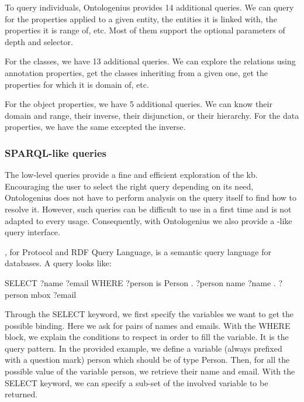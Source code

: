 To query individuals, Ontologenius provides 14 additional queries. We can query for the properties applied to a given entity, the entities it is linked with, the properties it is range of, etc. Most of them support the optional parameters of depth and selector.

For the classes, we have 13 additional queries. We can explore the relations using annotation properties, get the classes inheriting from a given one, get the properties for which it is domain of, etc.

For the object properties, we have 5 additional queries. We can know their domain and range, their inverse, their disjunction, or their hierarchy. For the data properties, we have the same excepted the inverse.

\subsubsection{SPARQL-like queries}

The low-level queries provide a fine and efficient exploration of the \acrshort{kb}. Encouraging the user to select the right query depending on its need, Ontologenius does not have to perform analysis on the query itself to find how to resolve it. However, such queries can be difficult to use in a first time and is not adapted to every usage. Consequently, with Ontologenius we also provide a \sparql{}-like query interface.

\sparql{}, for \sparql{} Protocol and RDF Query Language, is a semantic query language for databases. A \sparql{} query looks like:\\

\begin{minipage}{\textwidth}
\begin{verbatimtab}
SELECT ?name 
       ?email
WHERE
  {
    ?person  is    Person .
    ?person  name  ?name .
    ?person  mbox  ?email
  }
\end{verbatimtab}
\end{minipage}

Through the SELECT keyword, we first specify the variables we want to get the possible binding. Here we ask for pairs of names and emails. With the WHERE block, we explain the conditions to respect in order to fill the variable. It is the query pattern. In the provided example, we define a variable (always prefixed with a question mark) person which should be of type Person. Then, for all the possible value of the variable person, we retrieve their name and email. With the SELECT keyword, we can specify a sub-set of the involved variable to be returned.

